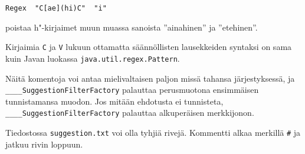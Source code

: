 \documentclass[12pt,a4paper]{scrartcl}
\begin{document}
\verb|Regex  "C[ae](hi)C"  "i"|

poistaa h"-kirjaimet muun muassa sanoista ''ainahinen'' ja
''etehinen''.

Kirjaimia \verb|C| ja \verb|V| lukuun ottamatta säännöllisten
lausekkeiden syntaksi on sama kuin Javan luokassa
\verb=java.util.regex.Pattern=.

\bigskip
Näitä komentoja voi antaa mielivaltaisen paljon missä tahansa
järjestyksessä, ja \\ \verb|____SuggestionFilterFactory| palauttaa
perusmuotona ensimmäisen tunnistamansa muodon. Jos mitään ehdotusta ei
tunnisteta, \verb|____SuggestionFilterFactory| palauttaa alkuperäisen
merkkijonon.

Tiedostossa \verb|suggestion.txt| voi olla tyhjiä rivejä. Kommentti
alkaa merkillä \verb|#| ja jatkuu rivin loppuun.
\end{document}
